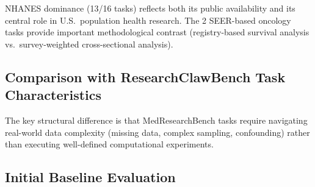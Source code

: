 \documentclass[12pt]{article}
\begin{document}
NHANES dominance (13/16 tasks) reflects both its public availability and its central role in U.S.\ population health research. The 2 SEER-based oncology tasks provide important methodological contrast (registry-based survival analysis vs.\ survey-weighted cross-sectional analysis).

\subsection{Comparison with ResearchClawBench Task Characteristics}

\begin{table}[ht]
\centering
\caption{Structural comparison between ResearchClawBench and MedResearchBench.}
\end{table}

The key structural difference is that MedResearchBench tasks require navigating real-world data complexity (missing data, complex sampling, confounding) rather than executing well-defined computational experiments.

\subsection{Initial Baseline Evaluation}
\end{document}
